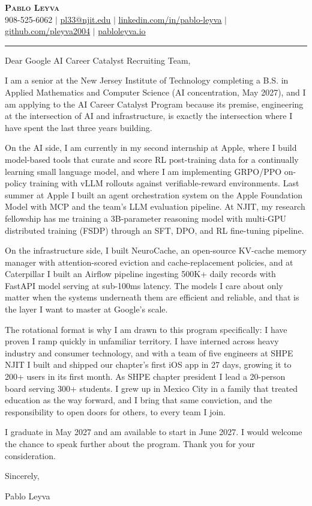 \documentclass[letterpaper,11pt]{article}
\begin{document}
\begin{center}
  \textbf{\Huge \scshape Pablo Leyva} \\ \vspace{3pt}
  \small 908-525-6062 $|$ \href{mailto:pl33@njit.edu}{\underline{pl33@njit.edu}} $|$
  \href{https://linkedin.com/in/pablo-leyva}{\underline{linkedin.com/in/pablo-leyva}} $|$
  \href{https://github.com/pleyva2004}{\underline{github.com/pleyva2004}} $|$
  \href{https://pabloleyva.io}{\underline{pabloleyva.io}}
\end{center}

\vspace{6pt}
\hrule
\vspace{14pt}

Dear Google AI Career Catalyst Recruiting Team,

I am a senior at the New Jersey Institute of Technology completing a B.S. in Applied Mathematics and Computer Science (AI concentration, May 2027), and I am applying to the AI Career Catalyst Program because its premise, engineering at the intersection of AI and infrastructure, is exactly the intersection where I have spent the last three years building.

On the AI side, I am currently in my second internship at Apple, where I build model-based tools that curate and score RL post-training data for a continually learning small language model, and where I am implementing GRPO/PPO on-policy training with vLLM rollouts against verifiable-reward environments. Last summer at Apple I built an agent orchestration system on the Apple Foundation Model with MCP and the team's LLM evaluation pipeline. At NJIT, my research fellowship has me training a 3B-parameter reasoning model with multi-GPU distributed training (FSDP) through an SFT, DPO, and RL fine-tuning pipeline.

On the infrastructure side, I built NeuroCache, an open-source KV-cache memory manager with attention-scored eviction and cache-replacement policies, and at Caterpillar I built an Airflow pipeline ingesting 500K+ daily records with FastAPI model serving at sub-100ms latency. The models I care about only matter when the systems underneath them are efficient and reliable, and that is the layer I want to master at Google's scale.

The rotational format is why I am drawn to this program specifically: I have proven I ramp quickly in unfamiliar territory. I have interned across heavy industry and consumer technology, and with a team of five engineers at SHPE NJIT I built and shipped our chapter's first iOS app in 27 days, growing it to 200+ users in its first month. As SHPE chapter president I lead a 20-person board serving 300+ students. I grew up in Mexico City in a family that treated education as the way forward, and I bring that same conviction, and the responsibility to open doors for others, to every team I join.

I graduate in May 2027 and am available to start in June 2027. I would welcome the chance to speak further about the program. Thank you for your consideration.

Sincerely,

Pablo Leyva
\end{document}
